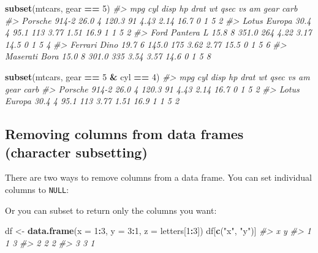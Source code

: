 \documentclass[]{book}
\newenvironment{Shaded}{\begin{snugshade}}{\end{snugshade}}
\newcommand{\KeywordTok}[1]{\textcolor[rgb]{0.13,0.29,0.53}{\textbf{#1}}}
\newcommand{\DataTypeTok}[1]{\textcolor[rgb]{0.13,0.29,0.53}{#1}}
\newcommand{\DecValTok}[1]{\textcolor[rgb]{0.00,0.00,0.81}{#1}}
\newcommand{\StringTok}[1]{\textcolor[rgb]{0.31,0.60,0.02}{#1}}
\newcommand{\CommentTok}[1]{\textcolor[rgb]{0.56,0.35,0.01}{\textit{#1}}}
\newcommand{\OtherTok}[1]{\textcolor[rgb]{0.56,0.35,0.01}{#1}}
\newcommand{\OperatorTok}[1]{\textcolor[rgb]{0.81,0.36,0.00}{\textbf{#1}}}
\newcommand{\NormalTok}[1]{#1}
\theoremstyle{definition}
\theoremstyle{definition}
\theoremstyle{definition}
\theoremstyle{remark}
\begin{document}
\begin{Shaded}
\begin{Highlighting}[]
\KeywordTok{subset}\NormalTok{(mtcars, gear }\OperatorTok{==}\StringTok{ }\DecValTok{5}\NormalTok{)}
\CommentTok{#>                 mpg cyl  disp  hp drat   wt qsec vs am gear carb}
\CommentTok{#> Porsche 914-2  26.0   4 120.3  91 4.43 2.14 16.7  0  1    5    2}
\CommentTok{#> Lotus Europa   30.4   4  95.1 113 3.77 1.51 16.9  1  1    5    2}
\CommentTok{#> Ford Pantera L 15.8   8 351.0 264 4.22 3.17 14.5  0  1    5    4}
\CommentTok{#> Ferrari Dino   19.7   6 145.0 175 3.62 2.77 15.5  0  1    5    6}
\CommentTok{#> Maserati Bora  15.0   8 301.0 335 3.54 3.57 14.6  0  1    5    8}

\KeywordTok{subset}\NormalTok{(mtcars, gear }\OperatorTok{==}\StringTok{ }\DecValTok{5} \OperatorTok{&}\StringTok{ }\NormalTok{cyl }\OperatorTok{==}\StringTok{ }\DecValTok{4}\NormalTok{)}
\CommentTok{#>                mpg cyl  disp  hp drat   wt qsec vs am gear carb}
\CommentTok{#> Porsche 914-2 26.0   4 120.3  91 4.43 2.14 16.7  0  1    5    2}
\CommentTok{#> Lotus Europa  30.4   4  95.1 113 3.77 1.51 16.9  1  1    5    2}
\end{Highlighting}
\end{Shaded}

\subsection{Removing columns from data frames (character
subsetting)}\label{removing-columns-from-data-frames-character-subsetting}

There are two ways to remove columns from a data frame. You can set
individual columns to \texttt{NULL}:

\begin{Shaded}
\end{Shaded}

Or you can subset to return only the columns you want:

\begin{Shaded}
\begin{Highlighting}[]
\NormalTok{df <-}\StringTok{ }\KeywordTok{data.frame}\NormalTok{(}\DataTypeTok{x =} \DecValTok{1}\OperatorTok{:}\DecValTok{3}\NormalTok{, }\DataTypeTok{y =} \DecValTok{3}\OperatorTok{:}\DecValTok{1}\NormalTok{, }\DataTypeTok{z =}\NormalTok{ letters[}\DecValTok{1}\OperatorTok{:}\DecValTok{3}\NormalTok{])}
\NormalTok{df[}\KeywordTok{c}\NormalTok{(}\StringTok{"x"}\NormalTok{, }\StringTok{"y"}\NormalTok{)]}
\CommentTok{#>   x y}
\CommentTok{#> 1 1 3}
\CommentTok{#> 2 2 2}
\CommentTok{#> 3 3 1}
\end{Highlighting}
\end{Shaded}
\end{document}
